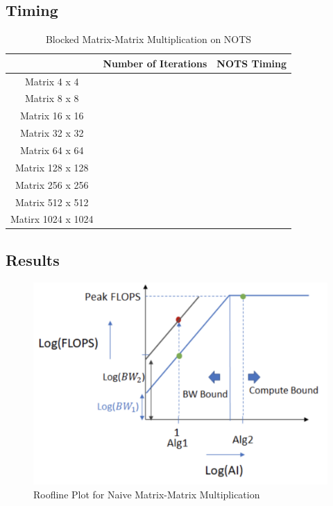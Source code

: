 \documentclass{article}
\begin{document}
\subsection{Timing}
    \begin{table}[ht!]
        \begin{flushleft}
        \caption{Blocked Matrix-Matrix Multiplication on NOTS}
        \begin{tabular}{|c|c|c|}
            \hline
            & Number of Iterations & NOTS Timing \\
            \hline
            Matrix 4 x 4 & & \\
            \hline
            Matrix 8 x 8 & & \\
            \hline
            Matrix 16 x 16 & & \\
            \hline
            Matrix 32 x 32 & & \\
            \hline
            Matrix 64 x 64 & & \\
            \hline
            Matrix 128 x 128 & & \\
            \hline
            Matrix 256 x 256 & & \\
            \hline
            Matrix 512 x 512 & & \\
            \hline 
            Matirx 1024 x 1024 & & \\
        \end{tabular}
    \end{flushleft}
\end{table}

\subsection{Results}

\begin{figure}[!htb]
    \centering
    \includegraphics[width=0.8\linewidth]{roofline_plot.png}
    \caption{Roofline Plot for Naive Matrix-Matrix Multiplication}
\end{figure}
\end{document}
